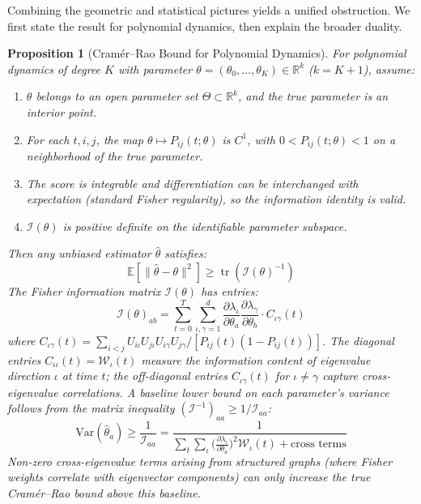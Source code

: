 \documentclass{article}
\newcommand{\RR}{\mathbb{R}}
\newcommand{\EE}{\mathbb{E}}
\DeclareMathOperator{\tr}{tr}
\theoremstyle{plain}
\newtheorem{proposition}{Proposition}
\theoremstyle{definition}
\theoremstyle{remark}
\begin{document}
Combining the geometric and statistical pictures yields a unified obstruction.
We first state the result for polynomial dynamics, then explain the broader duality.

\begin{proposition}[Cram\'er--Rao Bound for Polynomial Dynamics]\label{prop:cramer-rao}
For polynomial dynamics of degree $K$ with parameter $\theta = (\theta_0, \ldots, \theta_K) \in \RR^{k}$ ($k = K + 1$), assume:
\begin{enumerate}
\item $\theta$ belongs to an open parameter set $\Theta \subset \RR^k$, and the true parameter is an interior point.
\item For each $t, i, j$, the map $\theta \mapsto P_{ij}(t; \theta)$ is $C^1$, with $0 < P_{ij}(t; \theta) < 1$ on a neighborhood of the true parameter.
\item The score is integrable and differentiation can be interchanged with expectation (standard Fisher regularity), so the information identity is valid.
\item $\mathcal{I}(\theta)$ is positive definite on the identifiable parameter subspace.
\end{enumerate}

Then any unbiased estimator $\hat{\theta}$ satisfies:
\begin{equation}
\EE[\|\hat{\theta} - \theta\|^2] \ge \tr(\mathcal{I}(\theta)^{-1})
\end{equation}
The Fisher information matrix $\mathcal{I}(\theta)$ has entries:
\begin{equation}
\mathcal{I}(\theta)_{ab} = \sum_{t=0}^T \sum_{\iota, \gamma = 1}^d \frac{\partial \lambda_\iota}{\partial \theta_a} \frac{\partial \lambda_\gamma}{\partial \theta_b} \cdot C_{\iota\gamma}(t)
\end{equation}
where $C_{\iota\gamma}(t) = \sum_{i < j} U_{i\iota} U_{j\iota} U_{i\gamma} U_{j\gamma} / [P_{ij}(t)(1 - P_{ij}(t))]$.
The diagonal entries $C_{\iota\iota}(t) = \mathcal{W}_\iota(t)$ measure the information content of eigenvalue direction $\iota$ at time $t$; the off-diagonal entries $C_{\iota\gamma}(t)$ for $\iota \neq \gamma$ capture cross-eigenvalue correlations.
A baseline lower bound on each parameter's variance follows from the matrix inequality $(\mathcal{I}^{-1})_{aa} \ge 1 / \mathcal{I}_{aa}$:
\begin{equation}
\mathrm{Var}(\hat{\theta}_a) \ge \frac{1}{\mathcal{I}_{aa}} = \frac{1}{\sum_t \sum_\iota \bigl(\frac{\partial \lambda_\iota}{\partial \theta_a}\bigr)^2 \mathcal{W}_\iota(t) + \text{cross terms}}
\end{equation}
Non-zero cross-eigenvalue terms arising from structured graphs (where Fisher weights correlate with eigenvector components) can only \emph{increase} the true Cram\'er--Rao bound above this baseline.
\end{proposition}
\end{document}
